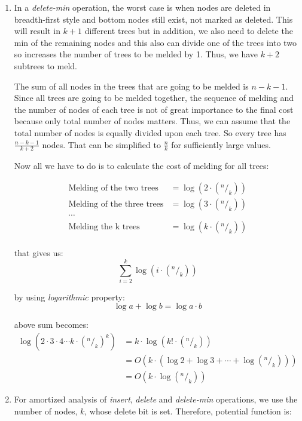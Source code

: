 \begin{enumerate}
  \item 
  In a \textit{delete-min} operation, the worst case is when nodes are deleted in breadth-first style and bottom nodes still exist, not marked as deleted. This will result in $k+1$ different trees but in addition, we also need to delete the min of the remaining nodes and this also can divide one of the trees into two so increases the number of trees to be melded by 1. Thus, we have $k + 2$ subtrees to meld.

  The sum of all nodes in the trees that are going to be melded is $n-k-1$. Since all trees are going to be melded together, the sequence of melding and the number of nodes of each tree is not of great importance to the final cost because only total number of nodes matters. Thus, we can assume that the total number of nodes is equally divided upon each tree. So every tree has $\frac{n - k - 1}{k + 2}$ nodes. That can be simplified to $\frac{n}{k}$ for sufficiently large values.

  Now all we have to do is to calculate the cost of melding for all trees:
  
  \begin{align*}
    \text{Melding of the two trees}   &= \log(2 \cdot (^n/_k)) \\
    \text{Melding of the three trees} &= \log(3 \cdot (^n/_k)) \\
    \cdots  \\
    \text{Melding the k trees}        &= \log(k \cdot (^n/_k)) \\
  \end{align*}

 that gives us:
 $$
  \sum_{i=2}^{k}{\log(i \cdot (^n/_k))} 
 $$

 by using \textit{logarithmic} property: 
 $$
  \log a + \log b = \log a \cdot b 
 $$
 
 above sum becomes: 
 \begin{align*}
   \log(2 \cdot 3 \cdot 4 \cdots k \cdot (^n/_k)^{k}) &= k \cdot \log (k! \cdot (^n/_k)) \\
   &= O(k \cdot (\log 2 + \log 3 + \cdots + \log (^n/_k))) \\
   &= O(k \cdot \log(^n/_k))
 \end{align*}

 \item
 For amortized analysis of \textit{insert}, \textit{delete} and \textit{delete-min} operations, we use the number of nodes, $k$,  whose delete bit is set. Therefore, potential function is:
 

\end{enumerate}

